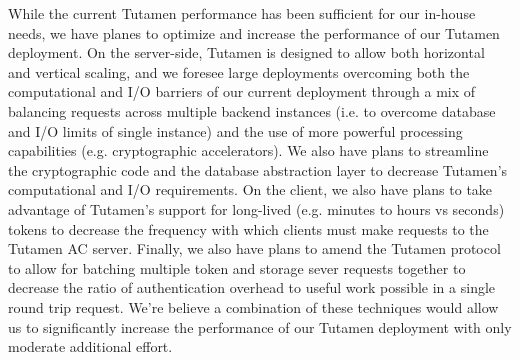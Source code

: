 While the current Tutamen performance has been sufficient for our
in-house needs, we have planes to optimize and increase the
performance of our Tutamen deployment. On the server-side, Tutamen is
designed to allow both horizontal and vertical scaling, and we foresee
large deployments overcoming both the computational and I/O barriers
of our current deployment through a mix of balancing requests across
multiple backend instances (i.e. to overcome database and I/O limits
of single instance) and the use of more powerful processing
capabilities (e.g. cryptographic accelerators). We also have plans to
streamline the cryptographic code and the database abstraction layer
to decrease Tutamen's computational and I/O requirements. On the
client, we also have plans to take advantage of Tutamen's support for
long-lived (e.g. minutes to hours vs seconds) tokens to decrease the
frequency with which clients must make requests to the Tutamen AC
server. Finally, we also have plans to amend the Tutamen protocol to
allow for batching multiple token and storage sever requests together
to decrease the ratio of authentication overhead to useful work
possible in a single round trip request. We're believe a combination
of these techniques would allow us to significantly increase the
performance of our Tutamen deployment with only moderate additional
effort.

